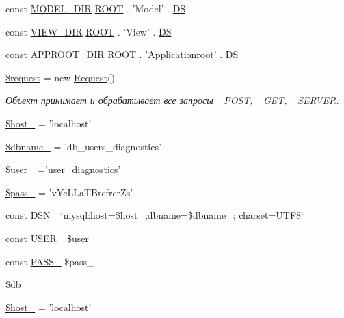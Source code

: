 \begin{DoxyCompactItemize}
const \hyperlink{conf___8php_af1b1241d1e4dfde50cb4cff4e42a4a06}{M\-O\-D\-E\-L\-\_\-\-D\-I\-R} \hyperlink{conf___8php_a18c0644836e196aed6d63779e14d6bd8}{R\-O\-O\-T} . 'Model' . \hyperlink{conf___8php_ae073998f73900b8375397889044c8313}{D\-S}
\item 
const \hyperlink{conf___8php_ab03c61889740a358477b63e1060ed780}{V\-I\-E\-W\-\_\-\-D\-I\-R} \hyperlink{conf___8php_a18c0644836e196aed6d63779e14d6bd8}{R\-O\-O\-T} . 'View' . \hyperlink{conf___8php_ae073998f73900b8375397889044c8313}{D\-S}
\item 
const \hyperlink{conf___8php_ae32575aa3e9747cd2ffbf47d3bd53850}{A\-P\-P\-R\-O\-O\-T\-\_\-\-D\-I\-R} \hyperlink{conf___8php_a18c0644836e196aed6d63779e14d6bd8}{R\-O\-O\-T} . 'Applicationroot' . \hyperlink{conf___8php_ae073998f73900b8375397889044c8313}{D\-S}
\item 
\hyperlink{conf___8php_abb35c8495a232b510389fa6d7b15d38a}{\$request} = new \hyperlink{class_request}{Request}()
\begin{DoxyCompactList}\small\item\em Объект принимает и обрабатывает все запросы \-\_\-\-P\-O\-S\-T, \-\_\-\-G\-E\-T, \-\_\-\-S\-E\-R\-V\-E\-R. \end{DoxyCompactList}\item 
\hyperlink{group___d_b__1_gaaef75b195cd712a695148aa5ea925ff6}{\$host\-\_} = 'localhost'
\item 
\hyperlink{group___d_b__1_gab06b43f5844a74e58c253d1313d698c7}{\$dbname\-\_} = 'db\-\_\-users\-\_\-diagnostics'
\item 
\hyperlink{group___d_b__1_gaa3ccf4fb708509a71be03fc744a99d58}{\$user\-\_} ='user\-\_\-diagnostics'
\item 
\hyperlink{group___d_b__1_ga41dc8c99445163effebda89820668a55}{\$pass\-\_} = 'v\-Yc\-L\-La\-T\-Brcfrcr\-Zs'
\item 
const \hyperlink{group___d_b__1_ga8ed489df371f2fa8bb344efb8d65bc9c}{D\-S\-N\-\_} \char`\"{}mysql\-:host=\$host\-\_;dbname=\$dbname\-\_; charset=U\-T\-F8\char`\"{}
\item 
const \hyperlink{group___d_b__1_ga2b39766e2bf04cce22a7deee95879619}{U\-S\-E\-R\-\_} \$user\-\_
\item 
const \hyperlink{group___d_b__1_ga5a1b531167aa8e2f89c1f9bf9b32ddf3}{P\-A\-S\-S\-\_} \$pass\-\_
\item 
\hyperlink{group___d_b__1_ga76fa04d1db973b91108c60680e5b956f}{\$db\-\_}
\item 
\hyperlink{group___d_b__2_ga1fca5ca6a998917bdf494cfd985b6025}{\$host\-\_} = 'localhost'

\end{DoxyCompactItemize}
